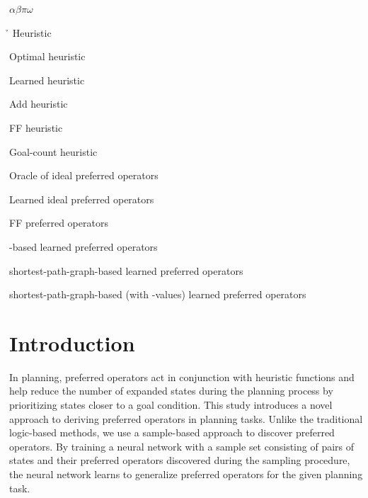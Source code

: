 \documentclass[ppgc,diss,english]{iiufrgs}
\begin{document}
\begin{listofsymbols}{$\alpha\beta\pi\omega$}
       \item[\h] Heuristic
       \item[\hstar] Optimal heuristic
       \item[\hnn] Learned heuristic
       \item[\hadd] Add heuristic
       \item[\hff] FF heuristic
       \item[\hgc] Goal-count heuristic
       \item[\postartable] Oracle of ideal preferred operators
       \item[\postar] Learned ideal preferred operators
       \item[\poff] FF preferred operators
       \item[\pofsm] \bfsrw-based learned preferred operators
       \item[\pog] shortest-path-graph-based learned preferred operators
       \item[\pogstar] shortest-path-graph-based (with \hstar-values) learned preferred operators
\end{listofsymbols}

\listoffigures

\listoftables

\listofalgorithms

\tableofcontents

%
%
\chapter{Introduction}
\label{cha:introduction}
In planning, preferred operators act in conjunction with heuristic functions and help reduce the number of expanded states during the planning process by prioritizing states closer to a goal condition.
This study introduces a novel approach to deriving preferred operators in planning tasks. Unlike the traditional logic-based methods, we use a sample-based approach to discover preferred operators. By training a neural network with a sample set consisting of pairs of states and their preferred operators discovered during the sampling procedure, the neural network learns to generalize preferred operators for the given planning task.
\end{document}
